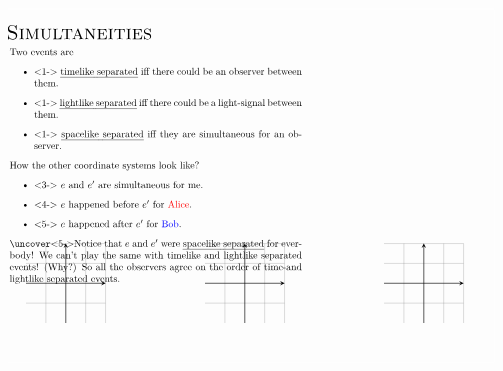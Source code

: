 \documentclass[xcolor=x11names]{beamer}
\newcommand{\CoordSys}[3]{
\coordinate (XY#1) at ([xshift=#2 cm, yshift=#3 cm]#1);
\coordinate (-XY#1) at ([xshift=-#2 cm, yshift=-#3 cm]#1);
\coordinate (-X#1) at ([xshift=-#2 cm]#1);
\coordinate (X#1) at ([xshift=#2 cm]#1);
\coordinate (Y#1) at ([yshift=#3 cm]#1);
\coordinate (-Y#1) at ([yshift=-#3 cm]#1);
\draw [help lines, step=.5cm] (-XY#1) grid (XY#1);
\draw[->] (-X#1)--(X#1);
\draw[->] (-Y#1)--(Y#1);
}
\begin{document}
\begin{frame}[fragile]
\vspace{-.55cm}
\[
\hspace{-1cm}
\begin{tikzpicture}[>=stealth, scale=1,
world/.style={inner sep=0, minimum size=.15cm, fill=black, circle},
worldline/.style={line width=1mm, rounded corners=1pt, opacity=.5},
axis/.style={->},
light/.style={orange, line width=.5mm},
]
\pgfmathdeclarefunction{XLorentz}{3}{\pgfmathparse{(#2 - #1*#3)/(sqrt(1-(#1)^2))}} %
\pgfmathdeclarefunction{YLorentz}{3}{\pgfmathparse{(#3 - #1*#2)/(sqrt(1-(#1)^2))}} %


\node[anchor=north west, inner sep=0] at (0.5,8.5) {\textsc{\Large Simultaneities}}; %
\draw[white]  %
      (0,0) rectangle (12.77,8.9);
\node[anchor=north west, scale=.7] at (0.5,8) {\begin{minipage}{10.5cm}
Two events are \begin{itemize}
\item<1-> \emph{timelike separated} iff there could be an observer between them.
\item<1-> \emph{lightlike separated} iff there could be a light-signal between them.
\item<1-> \emph{spacelike separated} iff they are simultaneous for an observer.
\end{itemize}
How the other coordinate systems look like?
\begin{itemize}
\item<3-> $e$ and $e'$ are simultaneous for me.
\item<4-> $e$ happened before $e'$ for \textcolor{red}{Alice}.
\item<5-> $e$ happened after $e'$ for \textcolor{blue}{Bob}.
\end{itemize}
\uncover<5->{Notice that $e$ and $e'$ were \emph{spacelike separated} for everbody! We can't play the same with timelike and lightlike separated events! (Why?) So all the observers agree on the order of time-and lightlike separated events.}
\end{minipage}
};
\coordinate(O1) at (2,2) {} {};
  \CoordSys{O1}{1}{1}
\coordinate(O2) at (6.5,2) {} {};
  \CoordSys{O2}{1}{1}
\coordinate(O3) at (11,2) {} {} {};
  \CoordSys{O3}{1}{1}


\end{tikzpicture}\]
\end{frame}
\end{document}
